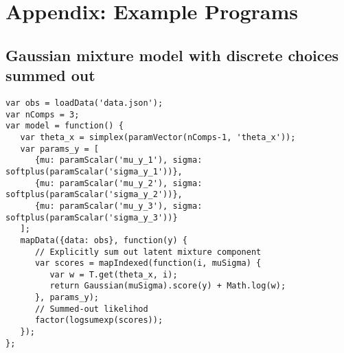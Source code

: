 \section{Appendix: Example Programs}
\label{sec:appendix_code}

\subsection{Gaussian mixture model with discrete choices summed out}
\label{sec:appendix_code:gmmSumOut}

\begin{lstlisting}
var obs = loadData('data.json');
var nComps = 3;
var model = function() {
   var theta_x = simplex(paramVector(nComps-1, 'theta_x'));
   var params_y = [
      {mu: paramScalar('mu_y_1'), sigma: softplus(paramScalar('sigma_y_1'))},
      {mu: paramScalar('mu_y_2'), sigma: softplus(paramScalar('sigma_y_2'))},
      {mu: paramScalar('mu_y_3'), sigma: softplus(paramScalar('sigma_y_3'))}
   ];
   mapData({data: obs}, function(y) {
   	  // Explicitly sum out latent mixture component
      var scores = mapIndexed(function(i, muSigma) {
         var w = T.get(theta_x, i);
         return Gaussian(muSigma).score(y) + Math.log(w);
      }, params_y);
      // Summed-out likelihod
      factor(logsumexp(scores));
   });
};
\end{lstlisting}
